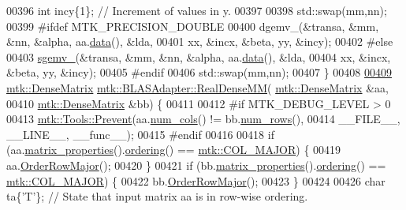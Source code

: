 \begin{DoxyCode}
00396   \textcolor{keywordtype}{int} incy\{1\};                            \textcolor{comment}{// Increment of values in y.}
00397 
00398   std::swap(mm,nn);
00399 \textcolor{preprocessor}{  #ifdef MTK\_PRECISION\_DOUBLE}
00400   dgemv\_(&transa, &mm, &nn, &alpha, aa.\hyperlink{classmtk_1_1DenseMatrix_a0c33b8a9e01d157c61ddbdf807c25d84}{data}(), &lda,
00401          xx, &incx, &beta, yy, &incy);
00402 \textcolor{preprocessor}{  #else}
00403   \hyperlink{namespacemtk_a88daff7ad6f251a58b94aa2d0c94d069}{sgemv\_}(&transa, &mm, &nn, &alpha, aa.\hyperlink{classmtk_1_1DenseMatrix_a0c33b8a9e01d157c61ddbdf807c25d84}{data}(), &lda,
00404         xx, &incx, &beta, yy, &incy);
00405 \textcolor{preprocessor}{  #endif}
00406   std::swap(mm,nn);
00407 \}
00408 
\hypertarget{mtk__blas__adapter_8cc_source_l00409}{}\hyperlink{classmtk_1_1BLASAdapter_acebd0e9bfe0bdd609c7fbea98ccfd3b5}{00409} \hyperlink{classmtk_1_1DenseMatrix}{mtk::DenseMatrix} \hyperlink{classmtk_1_1BLASAdapter_acebd0e9bfe0bdd609c7fbea98ccfd3b5}{mtk::BLASAdapter::RealDenseMM}(
      \hyperlink{classmtk_1_1DenseMatrix}{mtk::DenseMatrix} &aa,
00410                                                \hyperlink{classmtk_1_1DenseMatrix}{mtk::DenseMatrix} &bb) \{
00411 
00412 \textcolor{preprocessor}{  #if MTK\_DEBUG\_LEVEL > 0}
00413   \hyperlink{classmtk_1_1Tools_a332324c6f25e66be9dff48c5987a3b9f}{mtk::Tools::Prevent}(aa.\hyperlink{classmtk_1_1DenseMatrix_a41747502d468c6728a4be31501b16e0e}{num\_cols}() != bb.\hyperlink{classmtk_1_1DenseMatrix_a53f3afb3b6a8d21854458aaa9663cc74}{num\_rows}(),
00414                       \_\_FILE\_\_, \_\_LINE\_\_, \_\_func\_\_);
00415 \textcolor{preprocessor}{  #endif}
00416 
00418   \textcolor{keywordflow}{if} (aa.\hyperlink{classmtk_1_1DenseMatrix_a5aa83a0643f27a4652ea97630edf7143}{matrix\_properties}().\hyperlink{classmtk_1_1Matrix_a13cd17621652cd5551ff98549bd94df7}{ordering}() == 
      \hyperlink{namespacemtk_ga622801bd9f912d0f976c3e383f5f581ca7c11989c132253fb76b8f6b1314f7e13}{mtk::COL\_MAJOR}) \{
00419     aa.\hyperlink{classmtk_1_1DenseMatrix_ac2949efba3e8278335d45418c85433e4}{OrderRowMajor}();
00420   \}
00421   \textcolor{keywordflow}{if} (bb.\hyperlink{classmtk_1_1DenseMatrix_a5aa83a0643f27a4652ea97630edf7143}{matrix\_properties}().\hyperlink{classmtk_1_1Matrix_a13cd17621652cd5551ff98549bd94df7}{ordering}() == 
      \hyperlink{namespacemtk_ga622801bd9f912d0f976c3e383f5f581ca7c11989c132253fb76b8f6b1314f7e13}{mtk::COL\_MAJOR}) \{
00422     bb.\hyperlink{classmtk_1_1DenseMatrix_ac2949efba3e8278335d45418c85433e4}{OrderRowMajor}();
00423   \}
00424 
00426   \textcolor{keywordtype}{char} ta\{\textcolor{charliteral}{'T'}\}; \textcolor{comment}{// State that input matrix aa is in row-wise ordering.}

\end{DoxyCode}
